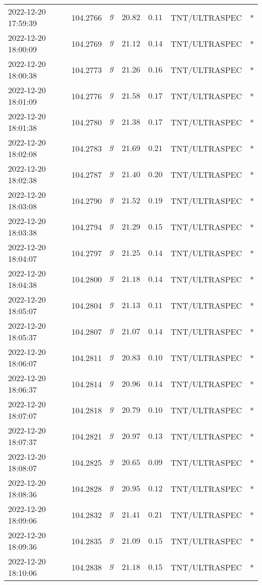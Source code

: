 \documentclass{nature_plusfigure}
\begin{document}
\begin{supplement}
\begin{center}
\begin{longtable}{lllllll}
2022-12-20 17:59:39 & 104.2766 & $g$ & $20.82$ & $0.11$ & TNT/ULTRASPEC & * \\ 
2022-12-20 18:00:09 & 104.2769 & $g$ & $21.12$ & $0.14$ & TNT/ULTRASPEC & * \\ 
2022-12-20 18:00:38 & 104.2773 & $g$ & $21.26$ & $0.16$ & TNT/ULTRASPEC & * \\ 
2022-12-20 18:01:09 & 104.2776 & $g$ & $21.58$ & $0.17$ & TNT/ULTRASPEC & * \\ 
2022-12-20 18:01:38 & 104.2780 & $g$ & $21.38$ & $0.17$ & TNT/ULTRASPEC & * \\ 
2022-12-20 18:02:08 & 104.2783 & $g$ & $21.69$ & $0.21$ & TNT/ULTRASPEC & * \\ 
2022-12-20 18:02:38 & 104.2787 & $g$ & $21.40$ & $0.20$ & TNT/ULTRASPEC & * \\ 
2022-12-20 18:03:08 & 104.2790 & $g$ & $21.52$ & $0.19$ & TNT/ULTRASPEC & * \\ 
2022-12-20 18:03:38 & 104.2794 & $g$ & $21.29$ & $0.15$ & TNT/ULTRASPEC & * \\ 
2022-12-20 18:04:07 & 104.2797 & $g$ & $21.25$ & $0.14$ & TNT/ULTRASPEC & * \\ 
2022-12-20 18:04:38 & 104.2800 & $g$ & $21.18$ & $0.14$ & TNT/ULTRASPEC & * \\ 
2022-12-20 18:05:07 & 104.2804 & $g$ & $21.13$ & $0.11$ & TNT/ULTRASPEC & * \\ 
2022-12-20 18:05:37 & 104.2807 & $g$ & $21.07$ & $0.14$ & TNT/ULTRASPEC & * \\ 
2022-12-20 18:06:07 & 104.2811 & $g$ & $20.83$ & $0.10$ & TNT/ULTRASPEC & * \\ 
2022-12-20 18:06:37 & 104.2814 & $g$ & $20.96$ & $0.14$ & TNT/ULTRASPEC & * \\ 
2022-12-20 18:07:07 & 104.2818 & $g$ & $20.79$ & $0.10$ & TNT/ULTRASPEC & * \\ 
2022-12-20 18:07:37 & 104.2821 & $g$ & $20.97$ & $0.13$ & TNT/ULTRASPEC & * \\ 
2022-12-20 18:08:07 & 104.2825 & $g$ & $20.65$ & $0.09$ & TNT/ULTRASPEC & * \\ 
2022-12-20 18:08:36 & 104.2828 & $g$ & $20.95$ & $0.12$ & TNT/ULTRASPEC & * \\ 
2022-12-20 18:09:06 & 104.2832 & $g$ & $21.41$ & $0.21$ & TNT/ULTRASPEC & * \\ 
2022-12-20 18:09:36 & 104.2835 & $g$ & $21.09$ & $0.15$ & TNT/ULTRASPEC & * \\ 
2022-12-20 18:10:06 & 104.2838 & $g$ & $21.18$ & $0.15$ & TNT/ULTRASPEC & * \\ 

\end{longtable}
\end{center}
\end{supplement}
\end{document}
